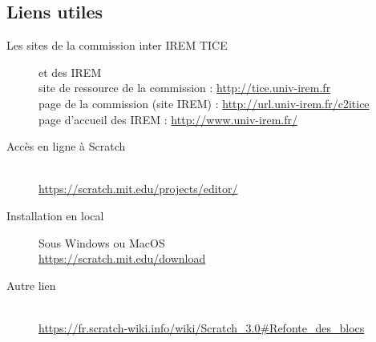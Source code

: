 \subsection{Liens utiles}
\begin{description}
    \item[Les sites de la commission inter IREM TICE] et des IREM ~\\
        site de ressource de la commission : \url{http://tice.univ-irem.fr}\\
        page de la commission (site IREM) : \url{http://url.univ-irem.fr/c2itice}\\
        page d'accueil des IREM : \url{http://www.univ-irem.fr/}
    \item[Accès en ligne à Scratch] ~\\
        \url{https://scratch.mit.edu/projects/editor/}
    \item[Installation en local] Sous Windows ou MacOS\\
		\url{https://scratch.mit.edu/download}
	\item[Autre lien]  ~\\
 		\url{https://fr.scratch-wiki.info/wiki/Scratch_3.0#Refonte_des_blocs}
\end{description}

